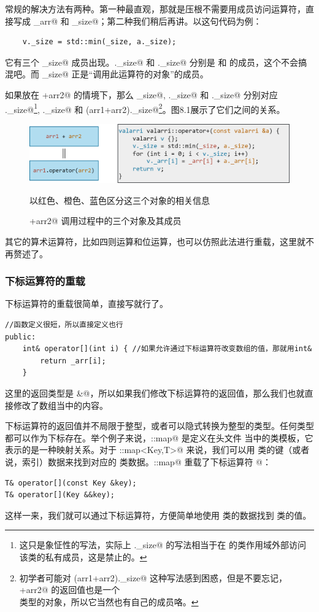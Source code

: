 常规的解决方法有两种。第一种最直观，那就是压根不需要用成员访问运算符，直接写成 \lstinline@_arr@ 和 \lstinline@_size@；第二种我们稍后再讲。以这句代码为例：
\begin{lstlisting}
    v._size = std::min(_size, a._size);
\end{lstlisting}
它有三个 \lstinline@_size@ 成员出现。\lstinline@v._size@ 和 \lstinline@a._size@ 分别是 \lstinline@v@ 和 \lstinline@a@ 的成员，这个不会搞混吧。而 \lstinline@_size@ 正是``调用此运算符的对象''的成员。\par
如果放在 +arr2@ 的情境下，那么 \lstinline@_size@, \lstinline@a._size@ 和 \lstinline@v._size@ 分别对应 ._size@\footnote{这只是象怔性的写法，实际上 ._size@ 的写法相当于在 \lstinline@valarri@ 的类作用域外部访问该类的私有成员，这是禁止的。}, ._size@ 和 \lstinline@(arr1+arr2)._size@\footnote{初学者可能对 \lstinline@(arr1+arr2)._size@ 这种写法感到困惑，但是不要忘记，+arr2@ 的返回值也是一个\\\lstinline@valarri@ 类型的对象，所以它当然也有自己的成员咯。}。图8.1展示了它们之间的关系。\par
\begin{figure}[htbp]
    \centering
    \includegraphics[width=\textwidth]{../images/generalized_parts/08_operator_overloading_as_member_function.drawio.png}
    \caption{+arr2@ 调用过程中的三个对象及其成员}
    \footnotesize{以红色、橙色、蓝色区分这三个对象的相关信息}
\end{figure}
其它的算术运算符，比如四则运算和位运算，也可以仿照此法进行重载，这里就不再赘述了。\par
\subsubsection*{下标运算符的重载}
下标运算符的重载很简单，直接写就行了。
\begin{lstlisting}
//函数定义很短，所以直接定义也行
public:
    int& operator[](int i) { //如果允许通过下标运算符改变数组的值，那就用int&
        return _arr[i];
    }
\end{lstlisting}
这里的返回类型是 \lstinline@int&@，所以如果我们修改下标运算符的返回值，那么我们也就直接修改了数组当中的内容。\par
下标运算符的返回值并不局限于整型，或者可以隐式转换为整型的类型。任何类型都可以作为下标存在。举个例子来说，\lstinline@std::map@ 是定义在头文件 \lstinline@map@ 当中的类模板，它表示的是一种映射关系。对于 \lstinline@std::map<Key,T>@ 来说，我们可以用 \lstinline@Key@ 类的键（或者说，索引）数据来找到对应的 \lstinline@T@ 类数据。\lstinline@std::map@ 重载了下标运算符 \lstinline@[]@：
\begin{lstlisting}
T& operator[](const Key &key);
T& operator[](Key &&key);
\end{lstlisting}
这样一来，我们就可以通过下标运算符，方便简单地使用 \lstinline@Key@ 类的数据找到 \lstinline@T@ 类的值。\par
